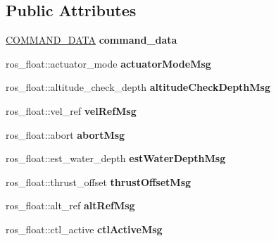 \subsection*{Public Attributes}
\begin{DoxyCompactItemize}
\item 
\mbox{\label{classCOMMAND__reader_a4c1e6162e78e90e6ba9c6989ac04206a}} 
\hyperlink{structCOMMAND__DATA}{C\+O\+M\+M\+A\+N\+D\+\_\+\+D\+A\+TA} {\bfseries command\+\_\+data}
\item 
\mbox{\label{classCOMMAND__reader_a7de64a00033fe9cd465be97ec641079b}} 
ros\+\_\+float\+::actuator\+\_\+mode {\bfseries actuator\+Mode\+Msg}
\item 
\mbox{\label{classCOMMAND__reader_a9902ff2682bb60a0457973f2592868be}} 
ros\+\_\+float\+::altitude\+\_\+check\+\_\+depth {\bfseries altitude\+Check\+Depth\+Msg}
\item 
\mbox{\label{classCOMMAND__reader_aa40709de3267e5a06a4fa5559d2bf546}} 
ros\+\_\+float\+::vel\+\_\+ref {\bfseries vel\+Ref\+Msg}
\item 
\mbox{\label{classCOMMAND__reader_a47578780050fe7a4ede918a170542dcc}} 
ros\+\_\+float\+::abort {\bfseries abort\+Msg}
\item 
\mbox{\label{classCOMMAND__reader_aa43264cf62d52f91a31e8c65a2e5683d}} 
ros\+\_\+float\+::est\+\_\+water\+\_\+depth {\bfseries est\+Water\+Depth\+Msg}
\item 
\mbox{\label{classCOMMAND__reader_ade5f822b879e5a91b0eda62430d6487b}} 
ros\+\_\+float\+::thrust\+\_\+offset {\bfseries thrust\+Offset\+Msg}
\item 
\mbox{\label{classCOMMAND__reader_a3c89048dd55e02eddaf70ece3f4b3fb0}} 
ros\+\_\+float\+::alt\+\_\+ref {\bfseries alt\+Ref\+Msg}
\item 
\mbox{\label{classCOMMAND__reader_a0cab908689f73d0f9b90b0bcb6f55dbf}} 
ros\+\_\+float\+::ctl\+\_\+active {\bfseries ctl\+Active\+Msg}
\item 

\end{DoxyCompactItemize}
